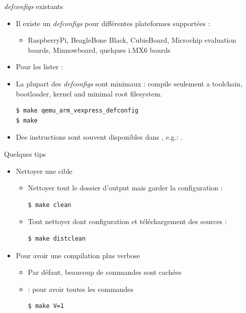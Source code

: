 \documentclass[aspectratio=169,obeyspaces,spaces,hyphens,dvipsnames]{beamer}
\begin{document}
\begin{frame}[fragile]{{\em defconfigs} existants}
  \begin{itemize}
  \item  Il existe un {\em defconfigs} pour différentes plateformes supportées :
    \begin{itemize}
    \item RaspberryPi, BeagleBone Black, CubieBoard, Microchip evaluation
      boards, Minnowboard, quelques i.MX6 boards
    \end{itemize}
  \item Pour les lister : 
  \item La plupart des {\em defconfigs} sont minimaux : compile seulement a
    toolchain, bootloader, kernel and minimal root filesystem.
    \begin{block}{}
\begin{verbatim}
$ make qemu_arm_vexpress_defconfig
$ make
\end{verbatim}
    \end{block}
  \item Des instructions sont souvent disponibles dans
    , e.g.: .
  \end{itemize}
\end{frame}

\begin{frame}[fragile]{Quelques tips}
  \begin{itemize}
  \item Nettoyer une cible
    \begin{itemize}
    \item Nettoyer tout le dossier d'output mais garder la configuration :
      \begin{block}{}
\begin{verbatim}
$ make clean
\end{verbatim}
      \end{block}
    \item Tout nettoyer dont configuration et téléchargement des sources :
      \begin{block}{}
\begin{verbatim}
$ make distclean
\end{verbatim}
      \end{block}
    \end{itemize}
  \item Pour avoir une compilation plus verbose
    \begin{itemize}
    \item Par défaut, beaucoup de commandes sont cachées
    \item {} : pour avoir toutes les commandes
      \begin{block}{}
\begin{verbatim}
$ make V=1
\end{verbatim}
      \end{block}
    \end{itemize}
  \end{itemize}
\end{frame}
\end{document}
